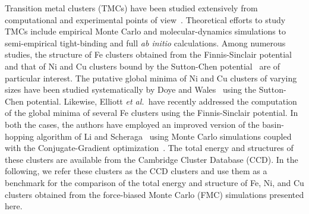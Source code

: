 \documentclass[a4paper]{jpconf}
\def\etal{\it et al.\,}
\begin{document}
Transition metal clusters (TMCs) have been studied extensively 
from computational and experimental points of 
view~\cite{Elliott2009a,Doye1998,Luo2002,Lopez1996,Parks1995}. 
Theoretical efforts to study TMCs include empirical Monte Carlo and 
molecular-dynamics simulations to semi-empirical tight-binding 
and full {\it ab initio} calculations.  Among numerous 
studies, the structure of Fe clusters obtained from the Finnis-Sinclair 
potential~\cite{Finnis1984,Finnis1986} and that of Ni and Cu clusters bound 
by the Sutton-Chen potential~\cite{Sutton} are of particular 
interest. 
The putative global minima of Ni and Cu clusters of varying sizes 
have been studied systematically by Doye and Wales~\cite{Doye1998} 
using the Sutton-Chen potential. Likewise, Elliott {\etal}\cite{Elliott2009a} 
have recently addressed the computation of the global minima of several 
Fe clusters using the Finnis-Sinclair potential.  In both the cases, 
the authors have employed an improved version of the basin-hopping algorithm of Li and 
Scheraga~\cite{Li1987} using Monte Carlo simulations 
coupled with the Conjugate-Gradient optimization~\cite{Wales1997}.
The total energy and structures of these clusters are 
available from the Cambridge Cluster Database (CCD). 
In the following, we refer these clusters as the CCD clusters and 
use them as a benchmark for the comparison of the total energy 
and structure of Fe, Ni, and Cu clusters obtained from the 
force-biased Monte Carlo (FMC) simulations presented here. 
\end{document}
